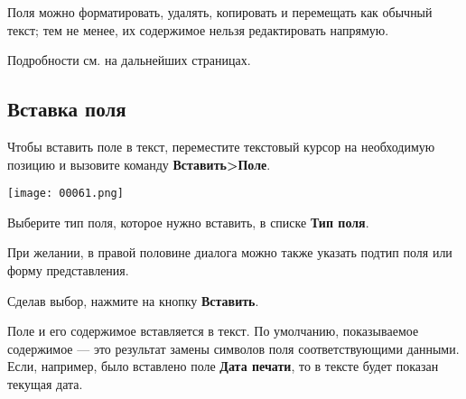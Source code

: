 \documentclass[a4paper,10pt]{article}
\begin{document}
Поля можно форматировать, удалять, копировать и перемещать как обычный текст; тем не менее, их содержимое нельзя редактировать напрямую.

Подробности см. на дальнейших страницах.

\subsection{Вставка поля}
Чтобы вставить поле в текст, переместите текстовый курсор на необходимую позицию и вызовите команду \textbf{Вставить>Поле}.

\texttt{[image: 00061.png]}

Выберите тип поля, которое нужно вставить, в списке \textbf{Тип поля}.

При желании, в правой половине диалога можно также указать подтип поля или форму представления.

Сделав выбор, нажмите на кнопку \textbf{Вставить}.

Поле и его содержимое вставляется в текст. По умолчанию, показываемое содержимое --- это результат замены символов поля соответствующими данными. Если, например, было вставлено поле \textbf{Дата печати}, то в тексте будет показан текущая дата.
\end{document}
